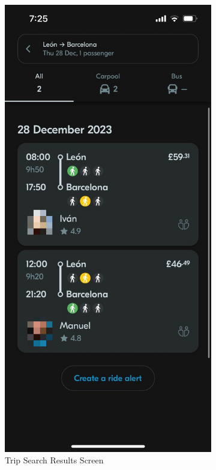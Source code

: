 \documentclass[a4paper, 12pt]{article} %
\begin{document}
\begin{figure}
\begin{subfigure}{0.3\textwidth}
                        \includegraphics[width=0.8\linewidth, height=0.9\textheight, keepaspectratio]{Images/Blablacar_search_result.png}
                        \caption{Trip Search Results Screen}
                        \label{fig:blabla_results}
                    \end{subfigure}
                    \begin{subfigure}{0.3\textwidth}

\end{subfigure}
\end{figure}
\end{document}
